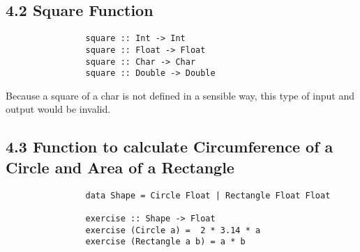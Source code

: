 \documentclass{article}
\begin{document}
	\subsection*{4.2 Square Function}
	\begin{adjustwidth}{2em}{2em}
		\begin{tcolorbox}
			\begin{verbatim}
				square :: Int -> Int
				square :: Float -> Float
				square :: Char -> Char
				square :: Double -> Double
			\end{verbatim}
		\end{tcolorbox}
		\noindent Because a square of a char is not defined in a sensible way, this type of input and output would be invalid.
	\end{adjustwidth}
	
	\subsection*{4.3 Function to calculate Circumference of a Circle and Area of a Rectangle}
	\begin{adjustwidth}{2em}{2em}	
		\begin{tcolorbox}
			\begin{verbatim}
				data Shape = Circle Float | Rectangle Float Float
				
				exercise :: Shape -> Float
				exercise (Circle a) =  2 * 3.14 * a
				exercise (Rectangle a b) = a * b
			\end{verbatim}
		\end{tcolorbox}	
	\end{adjustwidth}
\end{document}
